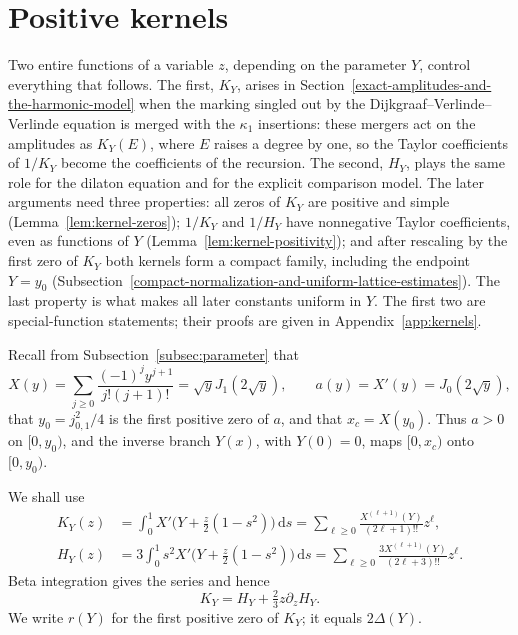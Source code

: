 \section{Positive kernels}\label{the-positive-compact-family-of-kernels}

Two entire functions of a variable $z$, depending on the parameter $Y$,
control everything that follows. The first, $K_Y$, arises in
Section~\ref{exact-amplitudes-and-the-harmonic-model} when the marking
singled out by the Dijkgraaf--Verlinde--Verlinde equation is merged with
the $\kappa_1$ insertions: these mergers act on the amplitudes as
$K_Y(E)$, where $E$ raises a degree by one, so the Taylor coefficients of
$1/K_Y$ become the coefficients of the recursion. The second, $H_Y$,
plays the same role for the dilaton equation and for the explicit
comparison model. The later arguments need three properties: all zeros
of $K_Y$ are positive and simple (Lemma~\ref{lem:kernel-zeros});
$1/K_Y$ and $1/H_Y$ have nonnegative Taylor coefficients, even as
functions of $Y$ (Lemma~\ref{lem:kernel-positivity}); and after
rescaling by the first zero of $K_Y$ both kernels form a compact family,
including the endpoint $Y=y_0$
(Subsection~\ref{compact-normalization-and-uniform-lattice-estimates}).
The last property is what makes all later constants uniform in $Y$.
The first two are special-function statements; their proofs are given
in Appendix~\ref{app:kernels}.

Recall from Subsection~\ref{subsec:parameter} that \[
 X(y)=\sum_{j\ge0}\frac{(-1)^j y^{j+1}}{j!(j+1)!}
      =\sqrt yJ_1(2\sqrt y),\qquad
 a(y)=X'(y)=J_0(2\sqrt y),
\] that \(y_0=j_{0,1}^2/4\) is the first positive zero of \(a\), and that
\(x_c=X(y_0)\). Thus \(a>0\) on \([0,y_0)\), and the inverse branch
\(Y(x)\), with \(Y(0)=0\), maps \([0,x_c)\) onto \([0,y_0)\).

We shall use \begin{equation}
\begin{split}
 K_Y(z)&=\int_0^1X'\bigl(Y+\tfrac z2(1-s^2)\bigr)\,\mathrm{d}s
       =\sum_{\ell\ge0}\frac{X^{(\ell+1)}(Y)}{(2\ell+1)!!}z^\ell,\\
 H_Y(z)&=3\int_0^1s^2X'\bigl(Y+\tfrac z2(1-s^2)\bigr)\,\mathrm{d}s
       =\sum_{\ell\ge0}\frac{3X^{(\ell+1)}(Y)}{(2\ell+3)!!}z^\ell.
 \end{split}                                                   \label{eq:P1}
\end{equation} Beta integration gives the series and hence \begin{equation}
K_Y=H_Y+\tfrac23z\partial_zH_Y.                    \label{eq:P2}
\end{equation} We write \(r(Y)\) for the first positive zero of \(K_Y\); it equals \(2\Delta(Y)\).

